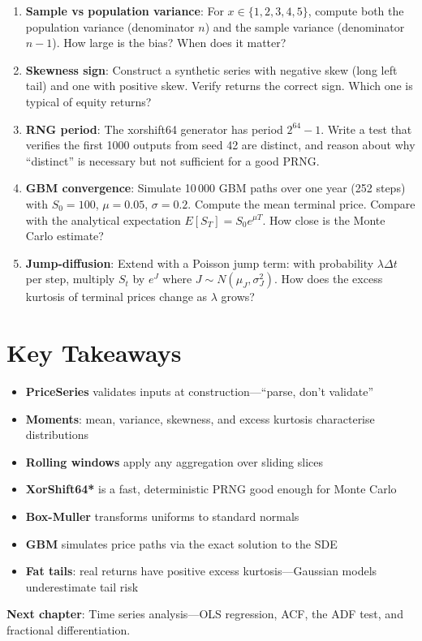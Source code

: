 \begin{enumerate}
    \item \textbf{Sample vs population variance}: For
      $x \in \{1, 2, 3, 4, 5\}$, compute both the population variance
      (denominator $n$) and the sample variance (denominator $n - 1$). How
      large is the bias? When does it matter?

    \item \textbf{Skewness sign}: Construct a synthetic series with negative
      skew (long left tail) and one with positive skew. Verify
       returns the correct sign. Which one is typical of
      equity returns?

    \item \textbf{RNG period}: The xorshift64\* generator has period
      $2^{64} - 1$. Write a test that verifies the first 1000 outputs from
      seed 42 are distinct, and reason about why ``distinct'' is necessary
      but not sufficient for a good PRNG.

    \item \textbf{GBM convergence}: Simulate 10\,000 GBM paths over one year
      (252 steps) with $S_0 = 100$, $\mu = 0.05$, $\sigma = 0.2$. Compute the
      mean terminal price. Compare with the analytical expectation
      $E[S_T] = S_0 e^{\mu T}$. How close is the Monte Carlo estimate?

    \item \textbf{Jump-diffusion}: Extend  with a Poisson
      jump term: with probability $\lambda \Delta t$ per step, multiply
      $S_t$ by $e^{J}$ where $J \sim N(\mu_J, \sigma_J^2)$. How does the
      excess kurtosis of terminal prices change as $\lambda$ grows?
\end{enumerate}

\section{Key Takeaways}

\begin{itemize}
    \item \textbf{PriceSeries} validates inputs at construction---``parse, don't
      validate''
    \item \textbf{Moments}: mean, variance, skewness, and excess kurtosis
      characterise distributions
    \item \textbf{Rolling windows} apply any aggregation over sliding slices
    \item \textbf{XorShift64*} is a fast, deterministic PRNG good enough for
      Monte Carlo
    \item \textbf{Box-Muller} transforms uniforms to standard normals
    \item \textbf{GBM} simulates price paths via the exact solution to the SDE
    \item \textbf{Fat tails}: real returns have positive excess kurtosis---Gaussian
      models underestimate tail risk
\end{itemize}

\vspace{1em}
\noindent\textbf{Next chapter}: Time series analysis---OLS regression, ACF, the
ADF test, and fractional differentiation.